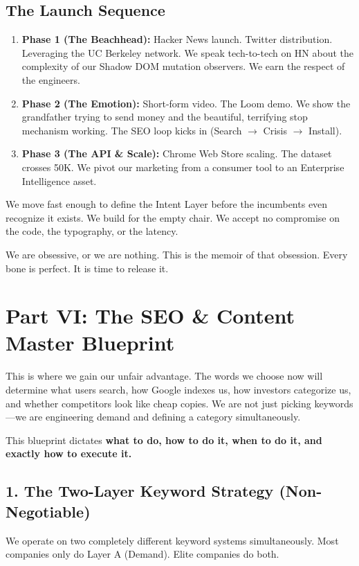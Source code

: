 \documentclass[11pt, letterpaper]{article}
\begin{document}
\subsection*{The Launch Sequence}
\begin{enumerate}
    \item \textbf{Phase 1 (The Beachhead):} Hacker News launch. Twitter distribution. Leveraging the UC Berkeley network. We speak tech-to-tech on HN about the complexity of our Shadow DOM mutation observers. We earn the respect of the engineers.
    \item \textbf{Phase 2 (The Emotion):} Short-form video. The Loom demo. We show the grandfather trying to send money and the beautiful, terrifying stop mechanism working. The SEO loop kicks in (Search $\rightarrow$ Crisis $\rightarrow$ Install).
    \item \textbf{Phase 3 (The API \& Scale):} Chrome Web Store scaling. The dataset crosses 50K. We pivot our marketing from a consumer tool to an Enterprise Intelligence asset.
\end{enumerate}

We move fast enough to define the Intent Layer before the incumbents even recognize it exists. We build for the empty chair. We accept no compromise on the code, the typography, or the latency. 

We are obsessive, or we are nothing. This is the memoir of that obsession. Every bone is perfect. It is time to release it.

\section*{Part VI: The SEO \& Content Master Blueprint}

This is where we gain our unfair advantage. The words we choose now will determine what users search, how Google indexes us, how investors categorize us, and whether competitors look like cheap copies. We are not just picking keywords---we are engineering demand and defining a category simultaneously.

This blueprint dictates \textbf{what to do, how to do it, when to do it, and exactly how to execute it.}

\subsection*{1. The Two-Layer Keyword Strategy (Non-Negotiable)}

We operate on two completely different keyword systems simultaneously. Most companies only do Layer A (Demand). Elite companies do both.
\end{document}

